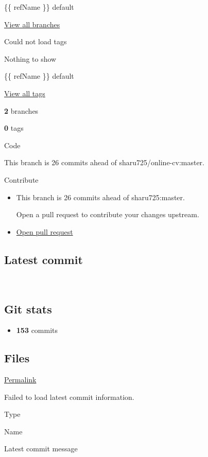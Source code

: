 \documentclass[]{article}
\providecommand{\tightlist}{%
  \setlength{\itemsep}{0pt}\setlength{\parskip}{0pt}}
\begin{document}
{\{\{ refName \}\}} {default}

\href{/CptMike/online-cv/branches}{View all branches}

\hypertarget{tags-menu}{}
Could not load tags

Nothing to show

{\{\{ refName \}\}} {default}

\href{/CptMike/online-cv/tags}{View all tags}

\textbf{2} {branches}

\textbf{0} {tags}

{ Code{} }

This branch is 26 commits ahead of sharu725/online-cv:master.

Contribute

\begin{itemize}
\item
  This branch is 26 commits ahead of sharu725:master.

  Open a pull request to contribute your changes upstream.
\item
  \href{/CptMike/online-cv/pull/new/master}{Open pull request}
\end{itemize}

\subsection{Latest commit}\label{latest-commit}

~

\subsection{Git stats}\label{git-stats}

\begin{itemize}
\tightlist
\item
  { \textbf{153} { commits } }
\end{itemize}

\subsection{Files}\label{files}

\href{/CptMike/online-cv/tree/8e5738f63ec16e5557b7fa1b8bf1ce9e87fb48fa}{Permalink}

Failed to load latest commit information.

Type

Name

Latest commit message
\end{document}
